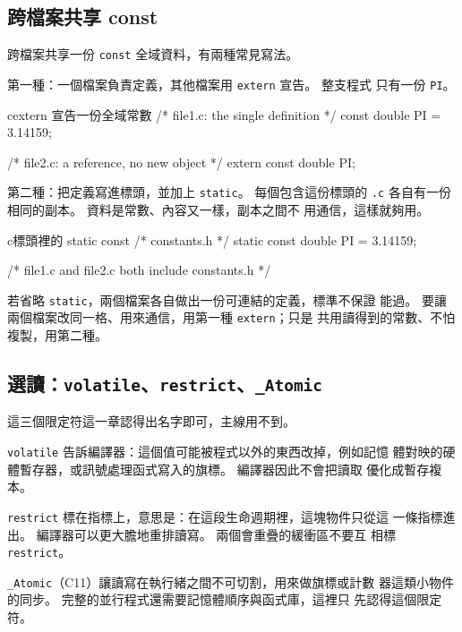 \subsection{跨檔案共享 const}

跨檔案共享一份 \texttt{const} 全域資料，有兩種常見寫法。

第一種：一個檔案負責定義，其他檔案用 \texttt{extern} 宣告。 整支程式
只有一份 \texttt{PI}。

\begin{code}{c}{extern 宣告一份全域常數}
/* file1.c: the single definition */
const double PI = 3.14159;

/* file2.c: a reference, no new object */
extern const double PI;
\end{code}

第二種：把定義寫進標頭，並加上 \texttt{static}。 每個包含這份標頭的
\texttt{.c} 各自有一份相同的副本。 資料是常數、內容又一樣，副本之間不
用通信，這樣就夠用。

\begin{code}{c}{標頭裡的 static const}
/* constants.h */
static const double PI = 3.14159;

/* file1.c and file2.c both include constants.h */
\end{code}

若省略 \texttt{static}，兩個檔案各自做出一份可連結的定義，標準不保證
能過。 要讓兩個檔案改同一格、用來通信，用第一種 \texttt{extern}；只是
共用讀得到的常數、不怕複製，用第二種。

\subsection{選讀：\texttt{volatile}、\texttt{restrict}、\texttt{\_Atomic}}

這三個限定符這一章認得出名字即可，主線用不到。

\texttt{volatile} 告訴編譯器：這個值可能被程式以外的東西改掉，例如記憶
體對映的硬體暫存器，或訊號處理函式寫入的旗標。 編譯器因此不會把讀取
優化成暫存複本。

\texttt{restrict} 標在指標上，意思是：在這段生命週期裡，這塊物件只從這
一條指標進出。 編譯器可以更大膽地重排讀寫。 兩個會重疊的緩衝區不要互
相標 \texttt{restrict}。

\texttt{\_Atomic}（C11）讓讀寫在執行緒之間不可切割，用來做旗標或計數
器這類小物件的同步。 完整的並行程式還需要記憶體順序與函式庫，這裡只
先認得這個限定符。


